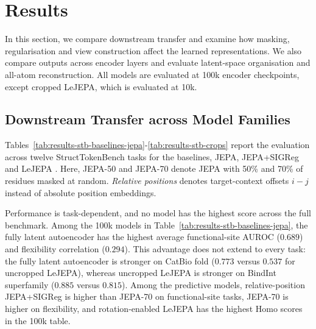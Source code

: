 

\newsavebox{\stbpreviewbox}
\newcommand{\stbpreviewfit}{\ifdim\wd\stbpreviewbox>\linewidth\resizebox{\linewidth}{!}{\usebox{\stbpreviewbox}}\else\usebox{\stbpreviewbox}\fi}
\section{Results}
\label{sec:results}

\providecommand{\methodplacement}[2]{#2}

\providecommand{\resulttodo}[1]{\par\noindent\textcolor{red}{\textbf{\{to add\}} #1}\par}
\providecommand{\resultstableformat}{%
  \setstretch{1}\fontsize{8.5}{10}\selectfont
  \setlength{\tabcolsep}{3pt}%
  \renewcommand{\arraystretch}{1}%
  \captionsetup{font=small,skip=4pt}}

In this section, we compare downstream transfer and examine how masking, regularisation and view construction affect the learned representations. We also compare outputs across encoder layers and evaluate latent-space organisation and all-atom reconstruction.
All models are evaluated at 100k encoder checkpoints, except cropped LeJEPA, which is evaluated at 10k.


\subsection{Downstream Transfer across Model Families}
\label{sec:results-transfer}


Tables~\ref{tab:results-stb-baselines-jepa}-\ref{tab:results-stb-crops} report the evaluation across twelve StructTokenBench tasks for the baselines, JEPA, JEPA+SIGReg and LeJEPA \citep{yuan2025protein}.
Here, JEPA-50 and JEPA-70 denote JEPA with 50\% and 70\% of residues masked at random. \emph{Relative positions} denotes target-context offsets $i-j$ instead of absolute position embeddings.


Performance is task-dependent, and no model has the highest score across the full benchmark.
Among the 100k models in Table~\ref{tab:results-stb-baselines-jepa}, the fully latent autoencoder has the highest average functional-site AUROC ($0.689$) and flexibility correlation ($0.294$).
This advantage does not extend to every task: the fully latent autoencoder is stronger on CatBio fold ($0.773$ versus $0.537$ for uncropped LeJEPA), whereas uncropped LeJEPA is stronger on BindInt superfamily ($0.885$ versus $0.815$).
Among the predictive models, relative-position JEPA+SIGReg is higher than JEPA-70 on functional-site tasks, JEPA-70 is higher on flexibility, and rotation-enabled LeJEPA has the highest Homo scores in the 100k table.


